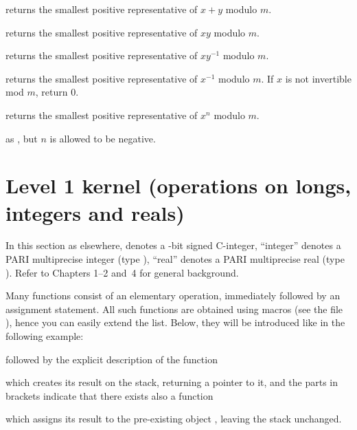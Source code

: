  returns the smallest
positive representative of $x + y$ modulo $m$.

 returns the smallest positive
representative of $x y$ modulo $m$.

 returns the smallest
positive representative of $x y^{-1}$ modulo $m$.

 returns the smallest
positive representative of $x^{-1}$ modulo $m$. If $x$ is not invertible
mod $m$, return $0$.

 returns the smallest
positive representative of $x^n$ modulo $m$.

 as , but $n$
is allowed to be negative.

\section{Level 1 kernel (operations on longs, integers and reals)}

\noindent
In this section as elsewhere,  denotes a \B-bit signed C-integer,
``integer'' denotes a PARI multiprecise integer (type ), ``real''
denotes a PARI multiprecise real (type ). Refer to Chapters
1--2 and~4 for general background.

 Many functions consist of an elementary operation,
immediately followed by an assignment statement. All such functions are
obtained using macros (see the file ), hence you can easily
extend the list. Below, they will be introduced like in the following
example:

 followed by the explicit
description of the function


\noindent which creates its result on the stack, returning a  pointer
to it, and the parts in brackets indicate that there exists also a function


\noindent which assigns its result to the pre-existing object
, leaving the stack unchanged.


